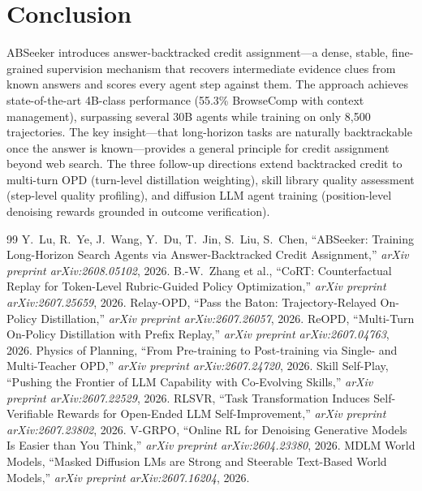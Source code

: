 \documentclass[11pt,a4paper]{article}
\begin{document}
\section{Conclusion}
ABSeeker introduces answer-backtracked credit assignment---a dense, stable, fine-grained supervision mechanism that recovers intermediate evidence clues from known answers and scores every agent step against them. The approach achieves state-of-the-art 4B-class performance (55.3\% BrowseComp with context management), surpassing several 30B agents while training on only 8,500 trajectories. The key insight---that long-horizon tasks are naturally backtrackable once the answer is known---provides a general principle for credit assignment beyond web search. The three follow-up directions extend backtracked credit to multi-turn OPD (turn-level distillation weighting), skill library quality assessment (step-level quality profiling), and diffusion LLM agent training (position-level denoising rewards grounded in outcome verification).

\begin{thebibliography}{99}
 Y.~Lu, R.~Ye, J.~Wang, Y.~Du, T.~Jin, S.~Liu, S.~Chen, ``ABSeeker: Training Long-Horizon Search Agents via Answer-Backtracked Credit Assignment,'' \emph{arXiv preprint arXiv:2608.05102}, 2026.
 B.-W.~Zhang et al., ``CoRT: Counterfactual Replay for Token-Level Rubric-Guided Policy Optimization,'' \emph{arXiv preprint arXiv:2607.25659}, 2026.
 Relay-OPD, ``Pass the Baton: Trajectory-Relayed On-Policy Distillation,'' \emph{arXiv preprint arXiv:2607.26057}, 2026.
 ReOPD, ``Multi-Turn On-Policy Distillation with Prefix Replay,'' \emph{arXiv preprint arXiv:2607.04763}, 2026.
 Physics of Planning, ``From Pre-training to Post-training via Single- and Multi-Teacher OPD,'' \emph{arXiv preprint arXiv:2607.24720}, 2026.
 Skill Self-Play, ``Pushing the Frontier of LLM Capability with Co-Evolving Skills,'' \emph{arXiv preprint arXiv:2607.22529}, 2026.
 RLSVR, ``Task Transformation Induces Self-Verifiable Rewards for Open-Ended LLM Self-Improvement,'' \emph{arXiv preprint arXiv:2607.23802}, 2026.
 V-GRPO, ``Online RL for Denoising Generative Models Is Easier than You Think,'' \emph{arXiv preprint arXiv:2604.23380}, 2026.
 MDLM World Models, ``Masked Diffusion LMs are Strong and Steerable Text-Based World Models,'' \emph{arXiv preprint arXiv:2607.16204}, 2026.
\end{thebibliography}
\end{document}
